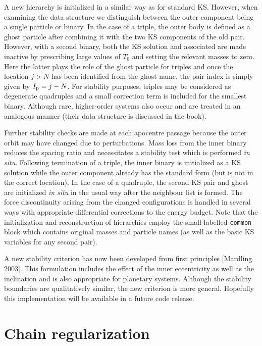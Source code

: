 \documentclass[12pt]{article}
\begin{document}
A new hierarchy is initialized in a similar way as for standard KS.
However, when examining the data structure we distinguish between the outer
component being a single particle or binary.
In the case of a triple, the outer body is defined as a ghost particle after
combining it with the two KS components of the old pair.
However, with a second binary, both the KS solution and associated \cm are
made inactive by prescribing large values of $T_0$ and setting the relevant
masses to zero.
Here the latter plays the role of the ghost particle for triples and once
the \cm location $j > N$ has been identified from the ghost name, the pair
index is simply given by $I_{\rm p} = j - N$.
For stability purposes, triples may be considered as degenerate quadruples
and a small correction term is included for the smallest binary.
Although rare, higher-order systems also occur and are treated in an
analogous manner (their data structure is discussed in the book). 

Further stability checks are made at each apocentre passage because the outer
orbit may have changed due to perturbations.
Mass loss from the inner binary reduces the spacing ratio and necessitates a
stability test which is performed {\it in situ}.
Following termination of a triple, the inner binary is initialized as a KS
solution while the outer component already has the standard form (but is not
in the correct location).
In the case of a quadruple, the second KS pair and ghost \cm are initialized
{\it in situ} in the usual way after the neighbour list is formed.
The force discontinuity arising from the changed configurations is handled in
several ways with appropriate differential corrections to the energy budget.
Note that the initialization and reconstruction of hierarchies employ the
small labelled {\tt common} block {} which contains original
masses and particle names (as well as the basic KS variables for any second
pair).

A new stability criterion has now been developed from first principles
[Mardling 2003].
This formulation includes the effect of the inner eccentricity as well as the
inclination and is also appropriate for planetary systems.
Although the stability boundaries are qualitatively similar, the new
criterion is more general.
Hopefully this implementation will be available in a future code release.

\section{Chain regularization}
\end{document}
